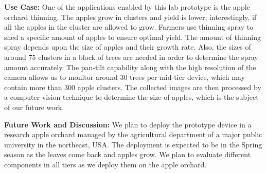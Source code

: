 \noindent
\textbf{Use Case:} One of the applications enabled by this lab prototype is the apple orchard thinning. The apples grow in clusters and yield is lower, interestingly, if all the apples in the cluster are allowed to grow. Farmers use thinning spray to shed a specific amount of apples to ensure optimal yield. The amount of thinning spray depends upon the size of apples and their growth rate. Also, the sizes of around 75 clusters in a block of trees are needed in order to determine the spray amount accurately. 
The pan-tilt capability along with the high resolution of the camera allows us to monitor around 30 trees per mid-tier device, which may contain more than 300 apple clusters. The collected images are then processed by a computer vision technique to determine the size of apples, which is the subject of our future work. 

\noindent
\textbf{Future Work and Discussion:} We plan to deploy the prototype device in a research apple orchard managed by the agricultural department of a major public university in the northeast, USA. The deployment is expected to be in the Spring season as the leaves come back and apples grow. We plan to evaluate different components in all tiers as we deploy them on the apple orchard. 





